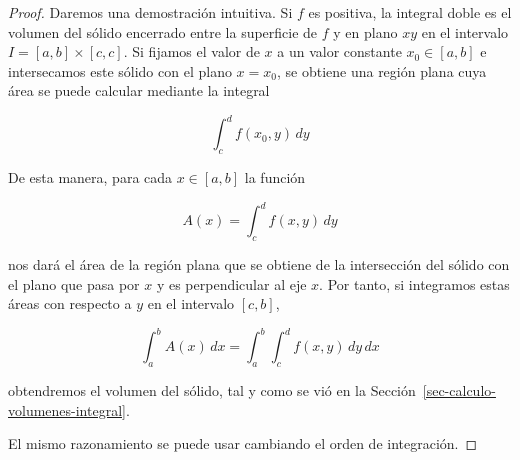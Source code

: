 \documentclass[
  a4paper,
]{scrreport}
\theoremstyle{plain}
\theoremstyle{definition}
\theoremstyle{plain}
\theoremstyle{plain}
\theoremstyle{definition}
\theoremstyle{definition}
\theoremstyle{remark}
\begin{document}
\begin{tcolorbox}[enhanced jigsaw, titlerule=0mm, arc=.35mm, colframe=quarto-callout-note-color-frame, bottomrule=.15mm, opacitybacktitle=0.6, rightrule=.15mm, coltitle=black, colback=white, toprule=.15mm, title=\textcolor{quarto-callout-note-color}{\faInfo}\hspace{0.5em}{Demostración}, leftrule=.75mm, bottomtitle=1mm, opacityback=0, breakable, colbacktitle=quarto-callout-note-color!10!white, toptitle=1mm, left=2mm]

\begin{proof}
Daremos una demostración intuitiva. Si \(f\) es positiva, la integral
doble es el volumen del sólido encerrado entre la superficie de \(f\) y
en plano \(xy\) en el intervalo \(I=[a,b]\times [c,c]\). Si fijamos el
valor de \(x\) a un valor constante \(x_0\in[a,b]\) e intersecamos este
sólido con el plano \(x=x_0\), se obtiene una región plana cuya área se
puede calcular mediante la integral

\[
\int_c^d f(x_0,y)\,dy
\]

De esta manera, para cada \(x\in[a,b]\) la función

\[
A(x) = \int_c^d f(x,y)\,dy
\]

nos dará el área de la región plana que se obtiene de la intersección
del sólido con el plano que pasa por \(x\) y es perpendicular al eje
\(x\). Por tanto, si integramos estas áreas con respecto a \(y\) en el
intervalo \([c,b]\),

\[
\int_a^b A(x)\,dx = \int_a^b\int_c^d f(x,y)\,dy\,dx
\]

obtendremos el volumen del sólido, tal y como se vió en la
Sección~\ref{sec-calculo-volumenes-integral}.

El mismo razonamiento se puede usar cambiando el orden de integración.
\end{proof}

\end{tcolorbox}
\end{document}
